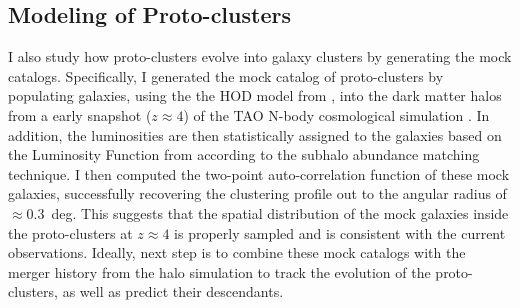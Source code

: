 \documentclass{article}
\begin{document}
\subsection*{Modeling of Proto-clusters}

I also study how proto-clusters evolve into galaxy clusters by generating the mock catalogs.
Specifically, I generated the mock catalog of proto-clusters by populating galaxies, using the the HOD model from \citet{2018PASJ...70S..11H}, into the dark matter halos from a early snapshot ($z\approx4$) of the TAO N-body cosmological simulation \citep{2016ApJS..223....9B}.
In addition, the luminosities are then statistically assigned to the galaxies based on the Luminosity Function from \citet{2015ApJ...803...34B} according to the subhalo abundance matching technique.
I then computed the two-point auto-correlation function of these mock galaxies, successfully recovering the clustering profile out to the angular radius of $\approx0.3$~deg.
This suggests that the spatial distribution of the mock galaxies inside the proto-clusters at $z\approx4$ is properly sampled and is consistent with the current observations.
Ideally, next step is to combine these mock catalogs with the merger history from the halo simulation to track the evolution of the proto-clusters, as well as predict their descendants.





\end{document}
